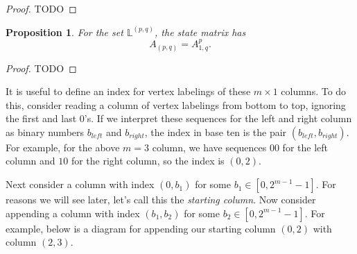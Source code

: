 \documentclass[12pt]{article}
\theoremstyle{plain}
\newtheorem{prop}[thm]{Proposition}
\theoremstyle{definition}
\theoremstyle{remark}
\theoremstyle{definition}
\begin{document}
\begin{proof}
    TODO 
\end{proof}

\begin{prop}
    For the set $\mathbb{L}^{(p,q)}$, the state matrix has
    $$A_{(p,q)} = A_{1,q}^p.$$
\end{prop}

\begin{proof}
    TODO 
\end{proof}



It is useful to define an index for vertex labelings of these $m \times 1$ columns. To do this, consider reading a column of vertex labelings from bottom to top, ignoring the first and last $0$'s. If we interpret these sequences for the left and right column as binary numbers $b_{left}$ and $b_{right}$, the index in base ten is the pair $(b_{left}, b_{right})$. For example, for the above $m=3$ column, we have sequences $00$ for the left column and $10$ for the right column, so the index is $(0,2)$.

Next consider a column with index $(0, b_{1})$ for some $b_{1} \in [0,2^{m-1}-1]$. For reasons we will see later, let's call this the \textit{starting column}. Now consider appending a column with index $(b_{1}, b_{2})$ for some $b_{2} \in [0,2^{m-1}-1]$. For example, below is a diagram for appending our starting column $(0,2)$ with column $(2,3)$. 
\end{document}
